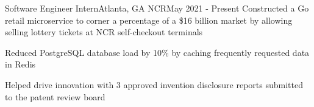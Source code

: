 \resumeSubheading
{Software Engineer Intern}{Atlanta, GA}
{NCR}{May 2021 - Present}
\resumeItemListStart
\resumeItem
{
  Constructed a Go retail microservice to corner a percentage of a \$16 billion
  market by allowing selling lottery tickets at NCR self-checkout terminals
}

\resumeItem
{
  Reduced PostgreSQL database load by 10\% by caching frequently requested data in
  Redis
}

\resumeItem
{
  Helped drive innovation with 3 approved invention disclosure reports submitted
  to the patent review board
}

\resumeItemListEnd


